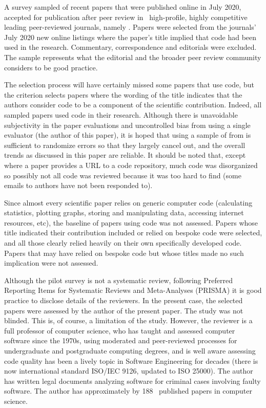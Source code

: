 \documentclass[10pt,a4paper]{article}
\begin{document}
\label{data-methods-section}
\label{data-methods-subsection}
A survey sampled of recent papers that were published online in July 2020, accepted for publication after peer review in \the\numberOfJournals\ high-profile, highly competitive leading peer-reviewed journals, namely \journalBreakdown. Papers were selected from the journals' July 2020 new online listings where the paper's title implied that code had been used in the research. Commentary, correspondence and editorials were excluded. The sample represents what the editorial and the broader peer review community considers to be good practice. 

The selection process will have certainly missed some papers that use code, but the criterion selects papers where the wording of the title indicates that the authors consider code to be a component of the scientific contribution. Indeed, all sampled papers used code in their research. Although there is unavoidable subjectivity in the paper evaluations and uncontrolled bias from using a single evaluator (the author of this paper), it is hoped that using a sample of  from  is sufficient to randomize errors so that they largely cancel out, and the overall trends as discussed in this paper are reliable. It should be noted that, except where a paper provides a URL to a code repository, much code was disorganized so possibly not all code was reviewed because it was too hard to find (some emails to authors have not been responded to). 
 
Since almost every scientific paper relies on generic computer code (calculating statistics, plotting graphs, storing and manipulating data, accessing internet resources, etc), the baseline of papers using code was not assessed. Papers whose title indicated their contribution included or relied on bespoke code were selected, and all those clearly relied heavily on their own specifically developed code. Papers that may have relied on bespoke code but whose titles made no such implication were not assessed.

Although the pilot survey is not a systematic review, following Preferred Reporting Items for Systematic Reviews and Meta-Analyses (PRISMA) \cite{prisma} it is good practice to disclose details of the reviewers. In the present case, the selected papers were assessed by the author of the present paper. The study was not blinded. This is, of course, a limitation of the study. However, the reviewer is a full professor of computer science, who has taught and assessed computer software since the 1970s, using moderated and peer-reviewed processes for undergraduate and postgraduate computing degrees, and is well aware assessing code quality has been a lively topic in Software Engineering for decades (there is now international standard ISO/IEC 9126, updated to ISO 25000). The author has written legal documents analyzing software for criminal cases involving faulty software. The author has approximately 
\newcount \papers {} %
\advance \papers by 188 %
\the\papers\ published papers in computer science. 
\end{document}
